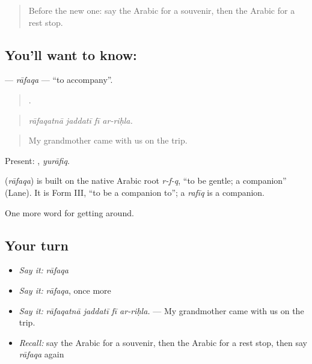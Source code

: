 \label{lesson:AR-C440-rafaqa}



\begin{quote}
Before the new one: say the Arabic for a souvenir, then the Arabic for a rest stop.
\end{quote}

\subsection*{You'll want to know: }
\textbf{} — \emph{rāfaqa} — \textquotedblleft{}to accompany\textquotedblright{}.

\begin{quote}
   .
\end{quote}

\begin{quote}
\emph{rāfaqatnā jaddatī fī ar-riḥla.}
\end{quote}

\begin{quote}
My grandmother came with us on the trip.
\end{quote}

Present: , \emph{yurāfiq}.

\begin{cousinweb}
\textbf{} (\emph{rāfaqa}) is built on the native Arabic root \emph{r-f-q}, \textquotedblleft{}to be gentle; a companion\textquotedblright{} (Lane). It is Form III, \textquotedblleft{}to be a companion to\textquotedblright{}; a \emph{rafīq} is a companion.
\end{cousinweb}

\begin{grammarlens}[title={What you've built}]
One more word for getting around.
\end{grammarlens}

\subsection*{Your turn}
\begin{itemize}
\raggedright
  \item \emph{Say it:} \emph{rāfaqa}
  \item \emph{Say it:} \emph{rāfaqa}, once more
  \item \emph{Say it:} \emph{rāfaqatnā jaddatī fī ar-riḥla.} — My grandmother came with us on the trip.
  \item \emph{Recall:} say the Arabic for a souvenir, then the Arabic for a rest stop, then say \emph{rāfaqa} again
\end{itemize}

